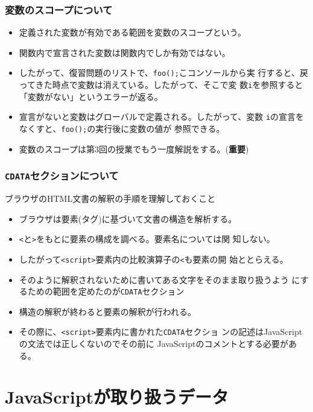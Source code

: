 \begin{frame}[containsverbatim]
 \frametitle{変数のスコープについて}
\begin{itemize}
 \item 定義された変数が有効である範囲を変数のスコープという。
 \item 関数内で宣言された変数は関数内でしか有効ではない。
 \item したがって、復習問題のリストで、\texttt{foo();}こコンソールから実
       行すると、戻ってきた時点で変数は消えている。したがって、そこで変
       数\texttt{i}を参照すると「変数がない」というエラーが返る。
 \item 宣言がないと変数はグローバルで定義される。したがって、変数
       \texttt{i}の宣言をなくすと、\texttt{foo();}の実行後に変数の値が
       参照できる。
 \item 変数のスコープは第3回の授業でもう一度解説をする。({\bfseries 重要})
\end{itemize} 
\end{frame}
\begin{frame}[containsverbatim]
 \frametitle{\texttt{CDATA}セクションについて}
 ブラウザのHTML文書の解釈の手順を理解しておくこと
 \begin{itemize}
  \item ブラウザは要素(タグ)に基づいて文書の構造を解析する。
  \item \Verb+<+と\Verb+>+をもとに要素の構成を調べる。要素名については関
        知しない。
  \item したがって\Verb+<script>+要素内の比較演算子の\Verb+<+も要素の開
        始ととらえる。
  \item そのように解釈されないために書いてある文字をそのまま取り扱うよう
        にするための範囲を定めたのが\texttt{CDATA}セクション
  \item 構造の解釈が終わると要素の解釈が行われる。
  \item その際に、\Verb+<script>+要素内に書かれた\texttt{CDATA}セクショ
        ンの記述はJavaScriptの文法では正しくないのでその前に
        JavaScriptのコメントとする必要がある。
 \end{itemize}
\end{frame}
\section{JavaScriptが取り扱うデータ}
